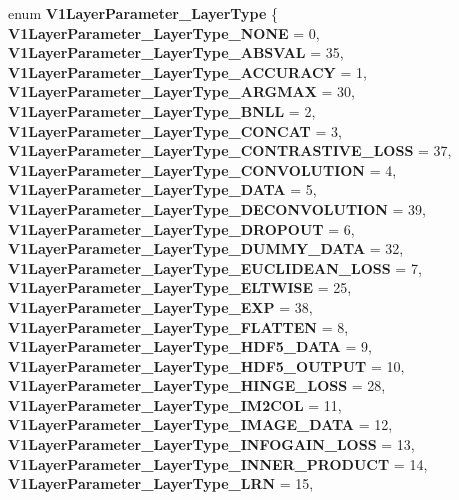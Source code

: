 \begin{DoxyCompactItemize}
\mbox{\label{namespacecaffe_ad73c014a600e7cc59405ca9c5e0681d4}} 
enum {\bfseries V1\+Layer\+Parameter\+\_\+\+Layer\+Type} \{ \newline
{\bfseries V1\+Layer\+Parameter\+\_\+\+Layer\+Type\+\_\+\+N\+O\+NE} = 0, 
{\bfseries V1\+Layer\+Parameter\+\_\+\+Layer\+Type\+\_\+\+A\+B\+S\+V\+AL} = 35, 
{\bfseries V1\+Layer\+Parameter\+\_\+\+Layer\+Type\+\_\+\+A\+C\+C\+U\+R\+A\+CY} = 1, 
{\bfseries V1\+Layer\+Parameter\+\_\+\+Layer\+Type\+\_\+\+A\+R\+G\+M\+AX} = 30, 
\newline
{\bfseries V1\+Layer\+Parameter\+\_\+\+Layer\+Type\+\_\+\+B\+N\+LL} = 2, 
{\bfseries V1\+Layer\+Parameter\+\_\+\+Layer\+Type\+\_\+\+C\+O\+N\+C\+AT} = 3, 
{\bfseries V1\+Layer\+Parameter\+\_\+\+Layer\+Type\+\_\+\+C\+O\+N\+T\+R\+A\+S\+T\+I\+V\+E\+\_\+\+L\+O\+SS} = 37, 
{\bfseries V1\+Layer\+Parameter\+\_\+\+Layer\+Type\+\_\+\+C\+O\+N\+V\+O\+L\+U\+T\+I\+ON} = 4, 
\newline
{\bfseries V1\+Layer\+Parameter\+\_\+\+Layer\+Type\+\_\+\+D\+A\+TA} = 5, 
{\bfseries V1\+Layer\+Parameter\+\_\+\+Layer\+Type\+\_\+\+D\+E\+C\+O\+N\+V\+O\+L\+U\+T\+I\+ON} = 39, 
{\bfseries V1\+Layer\+Parameter\+\_\+\+Layer\+Type\+\_\+\+D\+R\+O\+P\+O\+UT} = 6, 
{\bfseries V1\+Layer\+Parameter\+\_\+\+Layer\+Type\+\_\+\+D\+U\+M\+M\+Y\+\_\+\+D\+A\+TA} = 32, 
\newline
{\bfseries V1\+Layer\+Parameter\+\_\+\+Layer\+Type\+\_\+\+E\+U\+C\+L\+I\+D\+E\+A\+N\+\_\+\+L\+O\+SS} = 7, 
{\bfseries V1\+Layer\+Parameter\+\_\+\+Layer\+Type\+\_\+\+E\+L\+T\+W\+I\+SE} = 25, 
{\bfseries V1\+Layer\+Parameter\+\_\+\+Layer\+Type\+\_\+\+E\+XP} = 38, 
{\bfseries V1\+Layer\+Parameter\+\_\+\+Layer\+Type\+\_\+\+F\+L\+A\+T\+T\+EN} = 8, 
\newline
{\bfseries V1\+Layer\+Parameter\+\_\+\+Layer\+Type\+\_\+\+H\+D\+F5\+\_\+\+D\+A\+TA} = 9, 
{\bfseries V1\+Layer\+Parameter\+\_\+\+Layer\+Type\+\_\+\+H\+D\+F5\+\_\+\+O\+U\+T\+P\+UT} = 10, 
{\bfseries V1\+Layer\+Parameter\+\_\+\+Layer\+Type\+\_\+\+H\+I\+N\+G\+E\+\_\+\+L\+O\+SS} = 28, 
{\bfseries V1\+Layer\+Parameter\+\_\+\+Layer\+Type\+\_\+\+I\+M2\+C\+OL} = 11, 
\newline
{\bfseries V1\+Layer\+Parameter\+\_\+\+Layer\+Type\+\_\+\+I\+M\+A\+G\+E\+\_\+\+D\+A\+TA} = 12, 
{\bfseries V1\+Layer\+Parameter\+\_\+\+Layer\+Type\+\_\+\+I\+N\+F\+O\+G\+A\+I\+N\+\_\+\+L\+O\+SS} = 13, 
{\bfseries V1\+Layer\+Parameter\+\_\+\+Layer\+Type\+\_\+\+I\+N\+N\+E\+R\+\_\+\+P\+R\+O\+D\+U\+CT} = 14, 
{\bfseries V1\+Layer\+Parameter\+\_\+\+Layer\+Type\+\_\+\+L\+RN} = 15, 

\end{DoxyCompactItemize}
